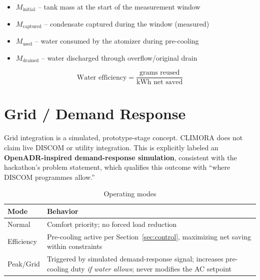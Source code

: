 \documentclass[11pt,a4paper]{article}
\begin{document}
\begin{itemize}[nosep]
    \item $M_{\text{initial}}$ -- tank mass at the start of the measurement window
    \item $M_{\text{captured}}$ -- condensate captured during the window (measured)
    \item $M_{\text{used}}$ -- water consumed by the atomizer during pre-cooling
    \item $M_{\text{drained}}$ -- water discharged through overflow/original drain
\end{itemize}

\begin{equation}
\text{Water efficiency} = \frac{\text{grams reused}}{\text{kWh net saved}}
\end{equation}

\section{Grid / Demand Response}
\label{sec:grid}

\begin{simbox}
Grid integration is a simulated, prototype-stage concept. CLIMORA does not claim live DISCOM or utility integration. This is explicitly labeled an \textbf{OpenADR-inspired demand-response simulation}, consistent with the hackathon's problem statement, which qualifies this outcome with ``where DISCOM programmes allow.''
\end{simbox}

\begin{table}[h!]
\centering
\caption{Operating modes}
\begin{tabular}{lp{9cm}}
\toprule
\textbf{Mode} & \textbf{Behavior} \\
\midrule
Normal & Comfort priority; no forced load reduction \\
Efficiency & Pre-cooling active per Section~\ref{sec:control}, maximizing net saving within constraints \\
Peak/Grid & Triggered by simulated demand-response signal; increases pre-cooling duty \emph{if water allows}; never modifies the AC setpoint \\
\bottomrule
\end{tabular}
\end{table}
\end{document}
